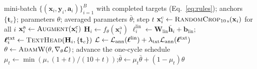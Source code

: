\begin{algorithm}[!htbp]
\caption{One training step of the proposed method.}\label{alg:step}
\begin{algorithmic}[1]
\Require mini-batch $\{(\mathbf{x}_i,\mathbf{y}_i,\mathbf{a}_i)\}_{i=1}^{B}$ with completed targets (Eq.~\eqref{eq:rules}); anchors $\{\mathbf{t}_c\}$; parameters $\theta$; averaged parameters $\bar\theta$; step $t$
\State $\mathbf{x}^{\mathrm{c}}_i \gets \textsc{RandomCrop}_{10\,\mathrm{s}}(\mathbf{x}_i)$ for all $i$ 
\State $\mathbf{x}^{\mathrm{a}}_i \gets \textsc{Augment}(\mathbf{x}^{\mathrm{c}}_i)$ 
\State $\mathbf{H}_i \gets f_\theta(\mathbf{x}^{\mathrm{a}}_i)$ 
\State $\boldsymbol{\ell}^{\mathrm{lin}}_i \gets \mathbf{W}_{\mathrm{lin}}\bar{\mathbf{h}}_i+\mathbf{b}_{\mathrm{lin}}$;\quad $\boldsymbol{\ell}^{\mathrm{txt}}_i \gets \textsc{TextHead}(\mathbf{H}_i,\{\mathbf{t}_c\})$ 
\State $\mathcal{L}\gets\mathcal{L}_{\mathrm{ann}}(\boldsymbol{\ell}^{\mathrm{lin}})+\lambda_{\mathrm{txt}}\mathcal{L}_{\mathrm{ann}}(\boldsymbol{\ell}^{\mathrm{txt}})$ 
\State $\theta\gets\textsc{AdamW}(\theta,\nabla_\theta\mathcal{L})$; advance the one-cycle schedule
\State $\mu_t\gets\min(\mu,(1+t)/(10+t))$;\quad $\bar\theta\gets\mu_t\bar\theta+(1-\mu_t)\theta$ 
\end{algorithmic}
\end{algorithm}
